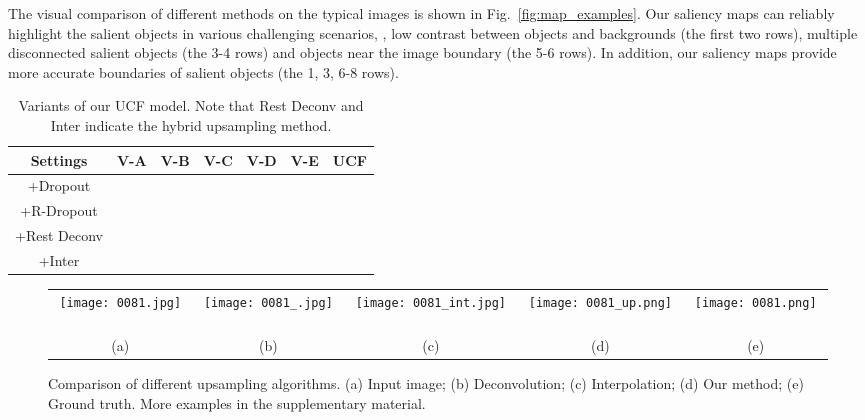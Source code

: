 \documentclass[10pt,twocolumn,letterpaper]{article}
\begin{document}
The visual comparison of different methods on the typical images is shown in Fig.~\ref{fig:map_examples}.
Our saliency maps can reliably highlight the salient objects in various challenging scenarios, \eg, low contrast between objects and backgrounds (the first two rows), multiple disconnected salient objects (the 3-4 rows) and objects near the image boundary (the 5-6 rows). In addition, our saliency maps provide more accurate boundaries of salient objects (the 1, 3, 6-8 rows).
\setlength{\tabcolsep}{5pt}
\begin{table}
\begin{center}
\begin{tabular}{|c|c|c|c|c|c|c|}
\hline
Settings&V-A&V-B&V-C&V-D&V-E&UCF\\
\hline
+Dropout        &&       &       &       &       &        \\
+R-Dropout      &       &&&       &       &  \\
\hline
+Rest Deconv      &&&       &&       &    \\
+Inter          &       &       &&       &&    \\
\hline
\end{tabular}
\end{center}
\vspace{-3mm}
\caption{Variants of our UCF model. Note that Rest Deconv and Inter indicate the hybrid upsampling method.}
\label{table:Ablation}
\vspace{-3mm}
\end{table}
\begin{figure}
\begin{tabular}{@{}c@{}c@{}c@{}c@{}c@{}}
\texttt{[image: 0081.jpg]} \ &
\texttt{[image: 0081\_.jpg]} \ &
\texttt{[image: 0081\_int.jpg]} \ &
\texttt{[image: 0081\_up.png]} \ &
\texttt{[image: 0081.png]} \ \\
{\small(a)} & {\small(b)} & {\small(c)} & {\small(d)} & {\small(e)}\\
\end{tabular}
\caption{Comparison of different upsampling algorithms. (a) Input image; (b) Deconvolution; (c) Interpolation; (d) Our method; (e) Ground truth. More examples in the supplementary material.
\label{fig:Ablation}}
\vspace{-6mm}
\end{figure}
\end{document}
